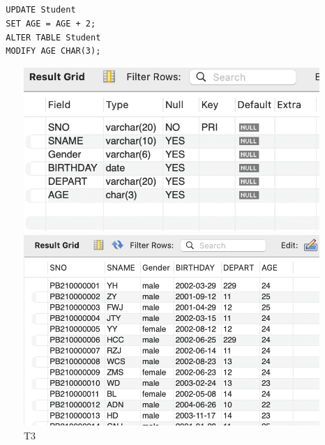\documentclass[UTF8]{ctexart}
\begin{document}
\subsection{}
\begin{lstlisting}
  UPDATE Student
  SET AGE = AGE + 2;
  ALTER TABLE Student
  MODIFY AGE CHAR(3);
\end{lstlisting}
\begin{figure}[H]
  \centering
  \begin{minipage}{0.4\linewidth}
    \includegraphics*[scale=0.4]{pics/3_1.png}
  \end{minipage}
  \begin{minipage}{0.4\linewidth}
    \includegraphics*[scale=0.3]{pics/3_2.png}
  \end{minipage}
  \caption*{T3}
\end{figure}
\end{document}

